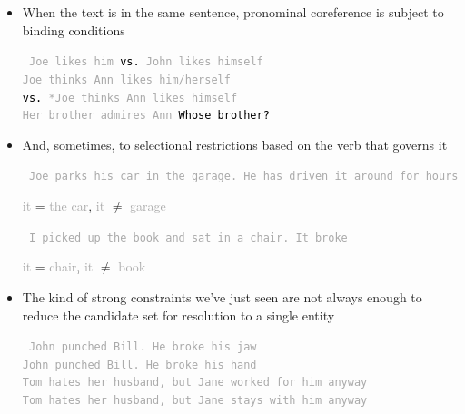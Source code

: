 \documentclass[landscape]{jhuslides3C}
\begin{document}

\vfill
\begin{itemize}
\item When the text is in the same sentence, pronominal coreference is subject to binding
conditions
\textcolor{darkgrey}{\begin{flushleft} \tt \vspace{-5mm}
Joe likes him \textcolor{black}{\rm vs.} John likes himself\\[3mm]
Joe thinks Ann likes him/herself\\
\textcolor{black}{\rm vs.} *Joe thinks Ann likes himself\\[3mm]
Her brother admires Ann \textcolor{black}{\rm Whose brother?}\pause
\end{flushleft}}
\item And, sometimes, to selectional restrictions based on the verb that governs it
\textcolor{darkgrey}{\begin{flushleft} \tt \vspace{-5mm}
Joe parks his car in the garage. He has driven it around for hours
\end{flushleft}}\vspace{-7mm}
\textcolor{darkgrey}{it} = \textcolor{darkgrey}{the car}, \textcolor{darkgrey}{it} $\neq$ \textcolor{darkgrey}{garage}
\textcolor{darkgrey}{\begin{flushleft} \tt \vspace{0mm}
I picked up the book and sat in a chair. It broke
\end{flushleft}}\vspace{-7mm}
\textcolor{darkgrey}{it} = \textcolor{darkgrey}{chair}, \textcolor{darkgrey}{it} $\neq$ \textcolor{darkgrey}{book}
\end{itemize}
\vfill


\vfill
\begin{itemize}
\item  The kind of strong constraints we've just seen are not always enough to reduce the candidate
set for resolution to a single entity
\textcolor{darkgrey}{\begin{flushleft} \tt
John punched Bill. He broke his jaw\\
John punched Bill. He broke his hand\\[1cm]
Tom hates her husband, but Jane worked for him anyway\\
Tom hates her husband, but Jane stays with him anyway
\end{flushleft}}
\end{itemize}
\vfill
\end{document}

